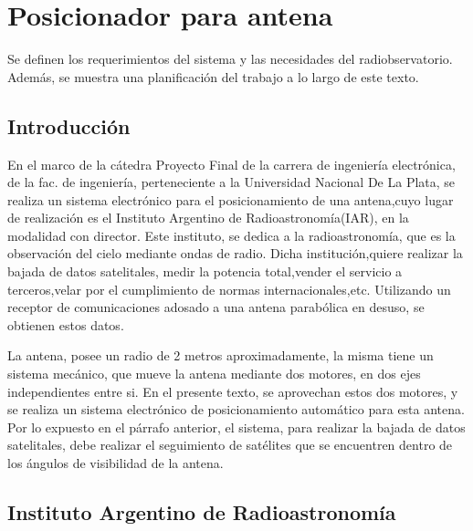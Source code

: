\renewcommand{\chaptername}{Requerimientos para estación terrena}
\chapter{Posicionador para antena }
\begin{center}
\begin{tcolorbox}[colback=gray!5!white, %
colframe=gray!75!black,
title= \center{\Large{Resumen}} ]

Se definen los requerimientos del sistema y las necesidades del radiobservatorio. Además, se muestra una planificación del trabajo a lo largo de este texto. 
\end{tcolorbox}
\end{center}    
\section{Introducción}  %
En el marco de la cátedra Proyecto Final de la carrera de ingeniería electrónica, de la fac. de ingeniería, perteneciente a la Universidad Nacional De La Plata, se realiza un sistema electrónico para el  posicionamiento de una antena,cuyo lugar de realización es el Instituto Argentino de Radioastronomía(IAR), en la modalidad con director. Este instituto, se dedica a la radioastronomía, que es la observación del cielo mediante ondas de radio. Dicha institución,quiere realizar la bajada de datos satelitales, medir la potencia total,vender el servicio a terceros,velar por el cumplimiento de normas internacionales,etc. Utilizando un receptor de comunicaciones adosado a una antena parabólica en desuso, se obtienen estos datos. 

La antena, posee un radio de 2 metros aproximadamente, la misma tiene un sistema mecánico, que mueve la antena mediante dos motores, en dos ejes independientes entre si. En el presente texto, se aprovechan estos dos motores, y se realiza un sistema electrónico de posicionamiento automático para esta antena. Por lo expuesto en el párrafo anterior, el sistema, para realizar la bajada de datos satelitales, debe realizar el seguimiento de satélites que se encuentren dentro de los ángulos de visibilidad de la antena.

\section{Instituto Argentino de Radioastronomía} 

